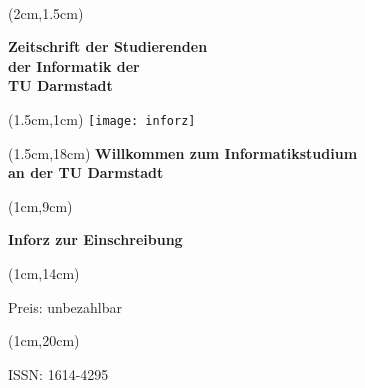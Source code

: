 \begin{titlepage}~

    \begin{textblock*}{12cm}(2cm,1.5cm)
        \begin{flushleft}
            \large\sffamily\textbf{
                \newline
                Zeitschrift der Studierenden\\
                der Informatik der \\
                TU Darmstadt}
        \end{flushleft}
    \end{textblock*}


    \begin{textblock*}{12cm}(1.5cm,1cm)
        \texttt{[image: inforz]}
    \end{textblock*}


    \begin{textblock*}{12cm}(1.5cm,18cm)
        \centering\Huge\sffamily\textbf{
            \textcolor{creme}{Willkommen zum Informatikstudium \\
                an der TU Darmstadt}}
    \end{textblock*}



    \begin{textblock*}{5cm}(1cm,9cm)
        \begin{rotate}{90}
            \sffamily\huge\textbf{
                Inforz zur Einschreibung \the\year}
        \end{rotate}
    \end{textblock*}


    \begin{textblock*}{2cm}(1cm,14cm)
        \begin{rotate}{90}
            \sffamily\small Preis: unbezahlbar
        \end{rotate}
    \end{textblock*}


    \begin{textblock*}{2cm}(1cm,20cm)
        \begin{rotate}{90}
            \sffamily ISSN: 1614-4295
        \end{rotate}
    \end{textblock*}

\end{titlepage}
\newpage
